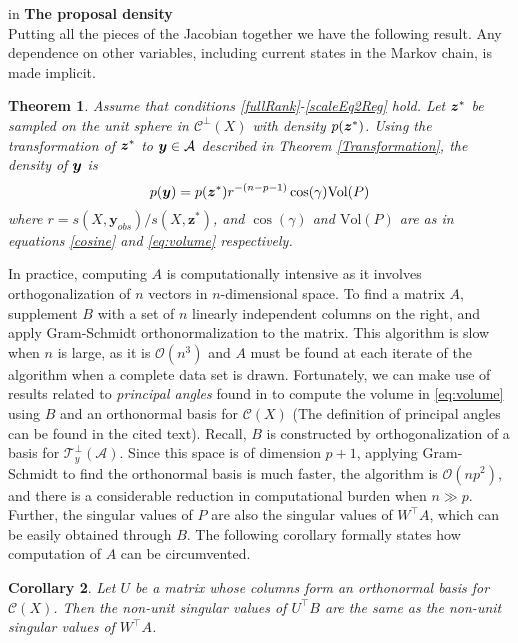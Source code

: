 \documentclass[12pt]{article}
\newcommand{\by}{\mbox{\boldmath $y$}}
\newcommand{\bz}{\mbox{\boldmath $z$}}
\newcommand{\mc}{\mathcal}
\newtheorem{theorem}{Theorem}[section]
\newtheorem{corollary}[theorem]{\bf Corollary}
\begin{document}
 in
\noindent
{\bf The proposal density} \\
Putting all the pieces of the Jacobian together we have the following result. Any dependence on other variables, including current states in the Markov chain, is made implicit. 
\begin{theorem} 
Assume that conditions \ref{fullRank}-\ref{scaleEq2Reg} hold.  Let $\bz^{*}$ be sampled on the unit sphere in $\mc {C}^\perp (X)$ with density $p(\bz^{*})$.  Using the transformation of $\bz^*$ to $\by\in \mc A$ described in Theorem \ref{Transformation}, the density of $\by$ is
\begin{equation}
\label{dens:ystst}
p(\by)=p(\bz^*) r^{-(n-p-1)} \cos(\gamma)\text{Vol} (P)
\end{equation}
where $r={s(X,\boldsymbol{y}_{obs})}/{s(X,  \boldsymbol{z}^{*})}$,
and $\cos(\gamma)$ and $\text{Vol} (P)$ are as in equations \eqref{cosine} and \eqref{eq:volume} respectively. 
\end{theorem} 

In practice, computing $A$ is computationally intensive as it involves orthogonalization of $n$ vectors in $n$-dimensional space. 
To find a matrix $A$, supplement $B$ with a set of $n$ linearly independent columns on the right, and apply Gram-Schmidt 
orthonormalization to the matrix.  This algorithm is slow when $n$ is large, as it is $\mc O(n^3)$ and $A$ must be found at each
iterate of the algorithm when a complete data set is drawn.  
Fortunately, we can make use of results related to \textit{principal angles} found in \cite{miao1992} to compute the volume in \eqref{eq:volume} using $B$ and an orthonormal basis for $\mc C (X)$ (The definition of principal angles can be found in the cited text). Recall, $B$ is constructed by orthogonalization of a basis for $\mc T_{y}^\perp(\mc A)$. Since this space is of dimension $p+1$, applying Gram-Schmidt to find the orthonormal basis is much faster, the algorithm is $\mc O(np^2)$, and there is a 
considerable reduction in computational burden when $n \gg p$. 
Further, the singular values of $P$ are also the singular values of
$W^\top A$, which can be easily obtained through $B$.
The following corollary formally states how computation of $A$ can be circumvented. 
\begin{corollary}
\label{theorem:sings}
Let $U$ be a matrix whose columns
form an orthonormal basis for $\mc C (X)$. Then the non-unit singular
values of $U^\top B$ are the same as the non-unit singular values of $W^\top A$.  
\end{corollary}
\end{document}

